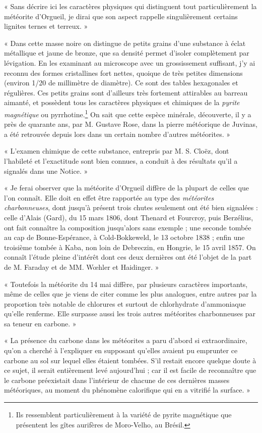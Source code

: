 \documentclass[a4paper, 11pt, oneside, polutonikogreek, french]{article}
\begin{document}
« Sans décrire ici les caractères physiques qui distinguent tout particulièrement la météorite d'Orgueil, je dirai que son aspect rappelle singulièrement certains lignites ternes et terreux. »

« Dans cette masse noire on distingue de petits grains d'une substance à éclat métallique et jaune de bronze, que sa densité permet d'isoler complètement par lévigation. En les examinant au microscope avec un grossissement suffisant, j'y ai reconnu des formes cristallines fort nettes, quoique de très petites dimensions (environ 1/20 de millimètre de diamètre). Ce sont des tables hexagonales et régulières. Ces petits grains sont d'ailleurs très fortement attirables au barreau aimanté, et possèdent tous les caractères physiques et chimiques de la \emph{pyrite magnétique} ou pyrrhotine.\footnote{Ils ressemblent particulièrement à la variété de pyrite magnétique que présentent les gîtes aurifères de Moro-Velho, au Brésil.} On sait que cette espèce minérale, découverte, il y a près de quarante ans, par M. Gustave Rose, dans la pierre météorique de Juvinas, a été retrouvée depuis lors dans un certain nombre d'autres météorites. »

« L'examen chimique de cette substance, entrepris par M. S. Cloëz, dont l'habileté et l'exactitude sont bien connues, a conduit à des résultats qu'il a signalés dans une Notice. »

« Je ferai observer que la météorite d'Orgueil diffère de la plupart de celles que l'on connaît. Elle doit en effet être rapportée au type des \emph{météorites charbonneuses}, dont jusqu'à présent trois chutes seulement ont été bien signalées : celle d'Alais (Gard), du 15 mars 1806, dont Thenard et Fourcroy, puis Berzélius, ont fait connaître la composition jusqu'alors sans exemple ; une seconde tombée au cap de Bonne-Espérance, à Cold-Bokkeweld, le 13 octobre 1838 ; enfin une troisième tombée à Kaba, non loin de Debreczin, en Hongrie, le 15 avril 1857. On connaît l'étude pleine d'intérêt dont ces deux dernières ont été l'objet de la part de M. Faraday et de MM. Wœhler et Haidinger. »

« Toutefois la météorite du 14 mai diffère, par plusieurs caractères importants, même de celles que je viens de citer comme les plus analogues, entre autres par la proportion très notable de chlorures et surtout de chlorhydrate d'ammoniaque qu'elle renferme. Elle surpasse aussi les trois autres météorites charbonneuses par sa teneur en carbone. »

« La présence du carbone dans les météorites a paru d'abord si extraordinaire, qu'on a cherché à l'expliquer en supposant qu'elles avaient pu emprunter ce carbone au sol sur lequel elles étaient tombées. S'il restait encore quelque doute à ce sujet, il serait entièrement levé aujourd'hui ; car il est facile de reconnaître que le carbone préexistait dans l'intérieur de chacune de ces dernières masses météoriques, au moment du phénomène calorifique qui en a vitrifié la surface. »
\end{document}
